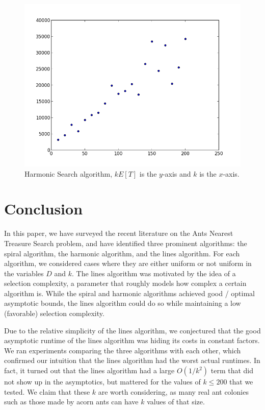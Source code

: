 \documentclass[runningheads,a4paper]{llncs}
\begin{document}
\begin{figure}
\centering
\label{harmonic}
\includegraphics[width=0.5\linewidth]{Harmonic.png}
\caption{Harmonic Search algorithm, $kE[T]$ is the $y$-axis and $k$ is the $x$-axis.}
\end{figure}

\section{Conclusion}
\label{conclusion}

In this paper, we have surveyed the recent literature on the Ants Nearest Treasure Search problem, and have identified three prominent algorithms: the spiral algorithm, the harmonic algorithm, and the lines algorithm. For each algorithm, we considered cases where they are either uniform or not uniform in the variables $D$ and $k$. The lines algorithm was motivated by the idea of a selection complexity, a parameter that roughly models how complex a certain algorithm is. While the spiral and harmonic algorithms achieved good / optimal asymptotic bounds, the lines algorithm could do so while maintaining a low (favorable) selection complexity.

Due to the relative simplicity of the lines algorithm, we conjectured that the good asymptotic runtime of the lines algorithm was hiding its costs in constant factors. We ran experiments comparing the three algorithms with each other, which confirmed our intuition that the lines algorithm had the worst actual runtimes. In fact, it turned out that the lines algorithm had a large $O(1/k^2)$ term that did not show up in the asymptotics, but mattered for the values of $k \leq 200$ that we tested. We claim that these $k$ are worth considering, as many real ant colonies such as those made by acorn ants can have $k$ values of that size.
\end{document}
